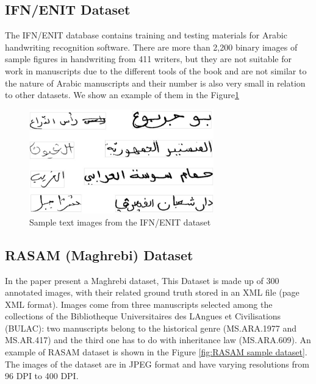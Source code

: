 \subsection{IFN/ENIT Dataset}
The IFN/ENIT \cite{IFNENIT} database contains training and testing materials for Arabic handwriting recognition software. There are more than 2,200 binary images of sample figures in handwriting from 411 writers\cite{ali2019efficient}, but they are not suitable for work in manuscripts due to the different tools of the book and are not similar to the nature of Arabic manuscripts and their number is also very small in relation to other datasets. We show an example of them in the Figure\ref{fig:Sample text images from the IFN/ENIT dataset}

\begin{figure}[!htb]
    \centering
    \includegraphics[width=8cm]{images/Sample-text-images-from-the-IFN-ENIT-database.png}
    \caption{Sample text images from the IFN/ENIT dataset}
    \label{fig:Sample text images from the IFN/ENIT dataset}
\end{figure}

\subsection{RASAM (Maghrebi) Dataset}
In the paper \cite{RASAM} present a Maghrebi dataset, This Dataset is made up of 300 annotated images, with their related ground truth stored in an XML file (page XML format). Images come from three manuscripts selected among the collections of the Bibliotheque Universitaires des LAngues et Civilisations (BULAC): two manuscripts belong to the historical genre (MS.ARA.1977 and MS.AR.417) and the third one has to do with inheritance law (MS.ARA.609). An example of RASAM dataset is shown in the Figure \ref{fig:RASAM sample dataset}. The images of the dataset are in JPEG format and have varying resolutions from 96 DPI to 400 DPI.

